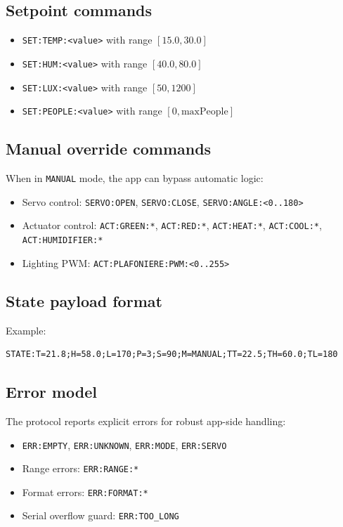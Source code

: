 \subsection{Setpoint commands}
\begin{itemize}
  \item \texttt{SET:TEMP:<value>} with range $[15.0,30.0]$
  \item \texttt{SET:HUM:<value>} with range $[40.0,80.0]$
  \item \texttt{SET:LUX:<value>} with range $[50,1200]$
  \item \texttt{SET:PEOPLE:<value>} with range $[0,\mathrm{maxPeople}]$
\end{itemize}

\subsection{Manual override commands}
When in \texttt{MANUAL} mode, the app can bypass automatic logic:
\begin{itemize}
  \item Servo control: \texttt{SERVO:OPEN}, \texttt{SERVO:CLOSE}, \texttt{SERVO:ANGLE:<0..180>}
  \item Actuator control: \texttt{ACT:GREEN:*}, \texttt{ACT:RED:*}, \texttt{ACT:HEAT:*}, \texttt{ACT:COOL:*}, \texttt{ACT:HUMIDIFIER:*}
  \item Lighting PWM: \texttt{ACT:PLAFONIERE:PWM:<0..255>}
\end{itemize}

\subsection{State payload format}
Example:
\begin{lstlisting}[style=cppstyle]
STATE:T=21.8;H=58.0;L=170;P=3;S=90;M=MANUAL;TT=22.5;TH=60.0;TL=180
\end{lstlisting}

\subsection{Error model}
The protocol reports explicit errors for robust app-side handling:
\begin{itemize}
  \item \texttt{ERR:EMPTY}, \texttt{ERR:UNKNOWN}, \texttt{ERR:MODE}, \texttt{ERR:SERVO}
  \item Range errors: \texttt{ERR:RANGE:*}
  \item Format errors: \texttt{ERR:FORMAT:*}
  \item Serial overflow guard: \texttt{ERR:TOO\_LONG}
\end{itemize}

